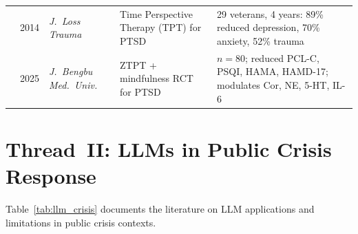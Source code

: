 \documentclass[12pt, a4paper]{article}
\begin{document}
\begin{longtable}{@{}p{3.8cm} p{1.0cm} p{2.6cm} p{4.5cm} p{3.2cm}@{}}
\textcite{sword2013time}
  & 2014 & \emph{J.\ Loss Trauma}
  & Time Perspective Therapy (TPT) for PTSD
  & 29 veterans, 4 years: 89\% reduced depression, 70\% anxiety, 52\% trauma \\[4pt]

\textcite{yu2025ztpt}
  & 2025 & \emph{J.\ Bengbu Med.\ Univ.}
  & ZTPT + mindfulness RCT for PTSD
  & $n=80$; reduced PCL-C, PSQI, HAMA, HAMD-17; modulates Cor, NE, 5-HT, IL-6 \\

\end{longtable}

\newpage

\section{Thread~II: LLMs in Public Crisis Response}

Table~\ref{tab:llm_crisis} documents the literature on LLM applications and limitations
in public crisis contexts.
\end{document}
